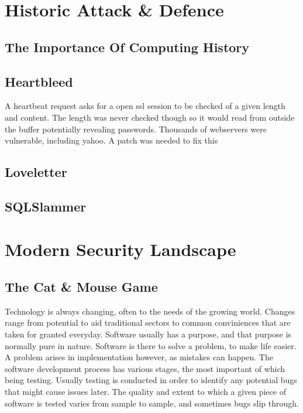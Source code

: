 


\chapter{Historic Attack \& Defence}
\section{The Importance Of Computing History}
\section{Heartbleed}
A heartbeat request asks for a open ssl session to be checked of a given length and content. The length was never checked though so it would read from outside the buffer potentially revealing passwords. Thousands of webservers were vulnerable, including yahoo. A patch was needed to fix this

\section{Loveletter}

\section{SQLSlammer}


\chapter{Modern Security Landscape}
\section{The Cat \& Mouse Game}
Technology is always changing, often to the needs of the growing world. Changes range from potential to aid traditional sectors to common conviniences that are taken for granted everyday.
Software usually has a purpose, and that purpose is normally pure in nature. Software is there to solve a problem, to make life easier. A problem arises in implementation however, as mistakes can happen.
The software development process has various stages, the most important of which being testing. Usually testing is conducted in order to identify any potential bugs that might cause issues later.
The quality and extent to which a given piece of software is tested varies from sample to sample, and sometimes bugs slip through.


